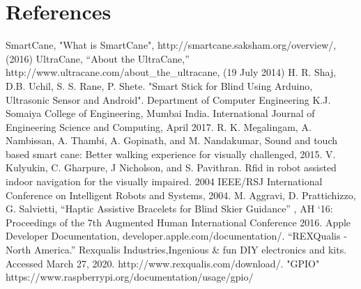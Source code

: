 \documentclass[letterpaper,12pt]{article}
\begin{document}
\section{References}
\begin{thebibliography}{9}
 SmartCane, "What is SmartCane", http://smartcane.saksham.org/overview/, (2016)
 UltraCane, “About the UltraCane,” http://www.ultracane.com/about\_the\_ultracane, (19 July 2014)
 H. R. Shaj, D.B. Uchil, S. S. Rane, P. Shete. "Smart Stick for Blind Using Arduino, Ultrasonic Sensor and Android". Department of Computer Engineering K.J. Somaiya College of Engineering, Mumbai India. International Journal of Engineering Science and Computing, April 2017. 
 R. K. Megalingam, A. Nambissan, A. Thambi, A. Gopinath, and M. Nandakumar, Sound and touch based smart cane: Better walking experience for visually challenged, 2015.
 V. Kulyukin, C. Gharpure, J Nicholson, and S. Pavithran. Rfid in robot assisted indoor navigation for the visually impaired. 2004 IEEE/RSJ International Conference on Intelligent Robots and Systems, 2004.
 M. Aggravi, D. Prattichizzo, G. Salvietti, “Haptic Assistive Bracelets for Blind Skier
Guidance” , AH ‘16: Proceedings of the 7th Augmented Human International Conference 2016.
 Apple Developer Documentation, developer.apple.com/documentation/.
“REXQualis - North America.” Rexqualis Industries,Ingenious \& fun DIY electronics and kits. Accessed March 27, 2020. http://www.rexqualis.com/download/.
 "GPIO" https://www.raspberrypi.org/documentation/usage/gpio/
\end{thebibliography}



\end{document}
